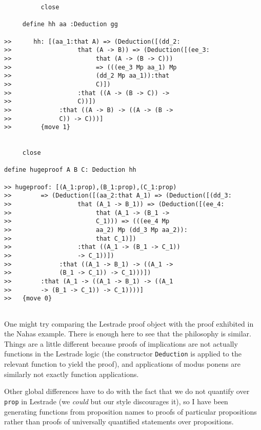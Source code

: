 \documentclass[12pt]{article}
\begin{document}
\begin{verbatim}
          close

     define hh aa :Deduction gg

>>      hh: [(aa_1:that A) => (Deduction([(dd_2:
>>                  that (A -> B)) => (Deduction([(ee_3:
>>                       that (A -> (B -> C))) 
>>                       => (((ee_3 Mp aa_1) Mp 
>>                       (dd_2 Mp aa_1)):that 
>>                       C)])
>>                  :that ((A -> (B -> C)) -> 
>>                  C))])
>>             :that ((A -> B) -> ((A -> (B -> 
>>             C)) -> C)))]
>>        {move 1}


     close

define hugeproof A B C: Deduction hh

>> hugeproof: [(A_1:prop),(B_1:prop),(C_1:prop) 
>>        => (Deduction([(aa_2:that A_1) => (Deduction([(dd_3:
>>                  that (A_1 -> B_1)) => (Deduction([(ee_4:
>>                       that (A_1 -> (B_1 -> 
>>                       C_1))) => (((ee_4 Mp 
>>                       aa_2) Mp (dd_3 Mp aa_2)):
>>                       that C_1)])
>>                  :that ((A_1 -> (B_1 -> C_1)) 
>>                  -> C_1))])
>>             :that ((A_1 -> B_1) -> ((A_1 -> 
>>             (B_1 -> C_1)) -> C_1)))])
>>        :that (A_1 -> ((A_1 -> B_1) -> ((A_1 
>>        -> (B_1 -> C_1)) -> C_1))))]
>>   {move 0}


\end{verbatim}

One might try comparing the Lestrade proof object with the proof exhibited in the Nahas example.  There is enough here to see that the philosophy is similar.
Things are a little different because proofs of implications are not actually functions in the Lestrade logic (the constructor {\tt Deduction} is applied to the relevant function
to yield the proof), and applications of modus ponens are similarly not exactly function applications.

Other global differences have to do with the fact that we do not quantify over {\tt prop\/} in Lestrade (we {\em could\/} but our style discourages it), so I have been generating functions from proposition names to proofs of particular propositions rather than proofs of universally quantified statements over propositions.
\end{document}
